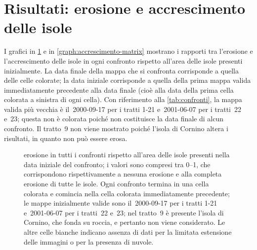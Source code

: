 \section{Risultati: erosione e accrescimento delle isole}
\label{sec:camb-ris}
I grafici in \cref{graph:erosione-matrix} e in \cref{graph:accrescimento-matrix} mostrano i rapporti tra l'erosione e l'accrescimento delle isole in ogni confronto rispetto all'area delle isole presenti inizialmente.
La data finale della mappa che si confronta corrisponde a quella delle celle colorate; la data iniziale corrisponde a quella della prima mappa valida immediatamente precedente alla data finale (cioè alla data della prima cella colorata a sinistra di ogni cella).
Con riferimento alla \cref{tab:confronti}, la mappa valida più vecchia è il~2000-09-17 per i tratti 1-21 e~2001-06-07 per i tratti~22 e~23; questa non è colorata poiché non costituisce la data finale di alcun confronto.
Il tratto~9 non viene mostrato poiché l'isola di Cornino altera i risultati, in quanto non può essere erosa.
%
\begin{figure}
	\centering
	
	\caption[erosione in tutti i confronti rispetto all'area delle isole presenti inizialmente]{erosione in tutti i confronti rispetto all'area delle isole presenti nella data iniziale del confronto; i valori sono compresi tra \numrange[range-phrase = { e }]{0}{1}, che corrispondono rispettivamente a nessuna erosione e alla completa erosione di tutte le isole.
	Ogni confronto termina in una cella colorata e comincia nella cella colorata immediatamente precedente; le mappe inizialmente valide sono il~2000-09-17 per i tratti 1-21 e~2001-06-07 per i tratti~22 e~23; nel tratto~9 è presente l'isola di Cornino, che fonda su roccia, e pertanto non viene considerato.
	Le altre celle bianche indicano assenza di dati per la limitata estensione delle immagini o per la presenza di nuvole.}
	\label{graph:erosione-matrix}
\end{figure}
%

